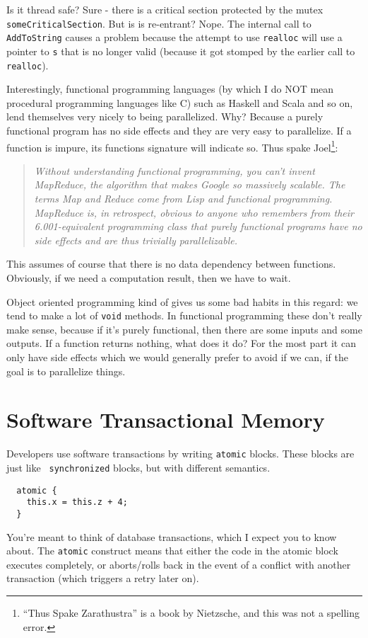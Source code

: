 Is it thread safe? Sure - there is a critical section protected by the mutex \texttt{someCriticalSection}. But is is re-entrant? Nope. The internal call to \texttt{AddToString} causes a problem because the attempt to use \texttt{realloc} will use a pointer to \texttt{s} that is no longer valid (because it got stomped by the earlier call to \texttt{realloc}).


Interestingly, functional programming languages (by which I do NOT mean procedural programming languages like C) such as Haskell and Scala and so on, lend themselves very nicely to being parallelized. Why? Because a purely functional program has no side effects and they are very easy to parallelize. If a function is impure, its functions signature will indicate so. Thus spake Joel\footnote{``Thus Spake Zarathustra'' is a book by Nietzsche, and this was not a spelling error.}:

\begin{quote}
\textit{Without understanding functional programming, you can't invent MapReduce, the algorithm that makes Google so massively scalable. The terms Map and Reduce come from Lisp and functional programming. MapReduce is, in retrospect, obvious to anyone who remembers from their 6.001-equivalent programming class that purely functional programs have no side effects and are thus trivially parallelizable.}~\cite{joel:functional}
\end{quote}

This assumes of course that there is no data dependency between functions. Obviously, if we need a computation result, then we have to wait. 

Object oriented programming kind of gives us some bad habits in this regard: we tend to make a lot of \texttt{void} methods. In functional programming these don't really make sense, because if it's purely functional, then there are some inputs and some outputs. If a function returns nothing, what does it do? For the most part it can only have side effects which we would generally prefer to avoid if we can, if the goal is to parallelize things. 

\section*{Software Transactional Memory}
Developers use software transactions by 
writing {\tt atomic} blocks. These blocks are just like {\tt
  synchronized} blocks, but with different semantics.

\begin{lstlisting}
  atomic {
    this.x = this.z + 4;
  }
\end{lstlisting}
You're meant to think of database transactions, which I expect you to
know about. The {\tt atomic} construct means that either the code in
the atomic block executes completely, or aborts/rolls back in the
event of a conflict with another transaction (which triggers a retry
later on).

